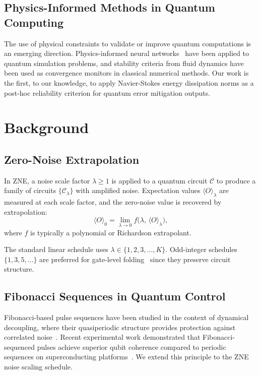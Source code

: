 \documentclass[twocolumn,showpacs,preprintnumbers,amsmath,amssymb,prl]{revtex4-2}
\begin{document}
\subsection{Physics-Informed Methods in Quantum Computing}

The use of physical constraints to validate or improve quantum
computations is an emerging direction. Physics-informed neural
networks~\cite{Raissi2019} have been applied to quantum simulation
problems, and stability criteria from fluid dynamics have been used
as convergence monitors in classical numerical methods. Our work is the
first, to our knowledge, to apply Navier-Stokes energy dissipation
norms as a post-hoc reliability criterion for quantum error mitigation
outputs.

\section{Background}
\label{sec:background}

\subsection{Zero-Noise Extrapolation}

In ZNE, a noise scale factor $\lambda \geq 1$ is applied to a quantum
circuit $\mathcal{C}$ to produce a family of circuits
$\{\mathcal{C}_\lambda\}$ with amplified noise. Expectation values
$\langle O \rangle_\lambda$ are measured at each scale factor, and the
zero-noise value is recovered by extrapolation:
\begin{equation}
    \langle O \rangle_0 = \lim_{\lambda \to 0}
    f\bigl(\lambda,\, \langle O \rangle_\lambda\bigr),
\end{equation}
where $f$ is typically a polynomial or Richardson extrapolant.

The standard linear schedule uses $\lambda \in \{1, 2, 3, \ldots, K\}$.
Odd-integer schedules $\{1, 3, 5, \ldots\}$ are preferred for gate-level
folding~\cite{LaRose2022} since they preserve circuit structure.

\subsection{Fibonacci Sequences in Quantum Control}

Fibonacci-based pulse sequences have been studied in the context of
dynamical decoupling, where their quasiperiodic structure provides
protection against correlated noise~\cite{Viola1998}. Recent experimental
work demonstrated that Fibonacci-sequenced pulses achieve superior qubit
coherence compared to periodic sequences on superconducting
platforms~\cite{Google2022Fibonacci}. We extend this principle to the
ZNE noise scaling schedule.
\end{document}
